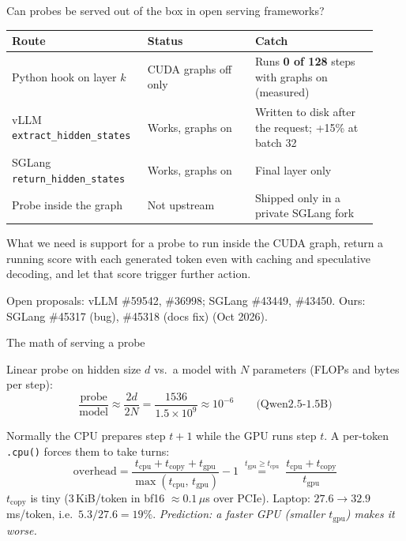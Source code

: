 \documentclass[final]{beamer}
\newlength{\COLGAP}\setlength{\COLGAP}{4.3cm}  %
\newlength{\colwidth}
\begin{document}
\begin{frame}[t]
\begin{columns}[t]
\begin{column}{\colwidth}
\begin{block}{Can probes be served out of the box in open serving frameworks?}
    \begin{table}
      \centering
      \begin{tabular}{@{}p{0.32\linewidth} p{0.28\linewidth} p{0.32\linewidth}@{}}
        \toprule
        \textbf{Route} & \textbf{Status} & \textbf{Catch} \\
        \midrule
        Python hook on layer $k$ & CUDA graphs off only & Runs \textbf{0 of 128} steps with graphs on (measured) \\
        vLLM \texttt{extract\_hidden\_states} & Works, graphs on & Written to disk after the request; +15\% at batch 32 \\
        SGLang \texttt{return\_hidden\_states} & Works, graphs on & Final layer only \\
        Probe inside the graph & Not upstream & Shipped only in a private SGLang fork \\
        \bottomrule
      \end{tabular}
    \end{table}

    What we need is support for a probe to run inside the CUDA graph, return a running score with each generated token even with caching and speculative decoding, and let that score trigger further action.

    {\footnotesize Open proposals: vLLM \#59542, \#36998; SGLang \#43449, \#43450.
    Ours: SGLang \#45317 (bug), \#45318 (docs fix) (Oct 2026).}

  \end{block}

  \vspace{\COLGAP}
  \begin{exampleblock}{The math of serving a probe}


    Linear probe on hidden size $d$ vs.\ a model with $N$ parameters (FLOPs and bytes per step):
    \[
      \frac{\text{probe}}{\text{model}} \approx \frac{2d}{2N}
      = \frac{1536}{1.5\times 10^{9}} \approx 10^{-6}
      \qquad \text{(Qwen2.5-1.5B)}
    \]


    Normally the CPU prepares step $t{+}1$ while the GPU runs step $t$. A
    per-token \texttt{.cpu()} forces them to take turns:
    \[
      \text{overhead}
      = \frac{t_{\text{cpu}} + t_{\text{copy}} + t_{\text{gpu}}}{\max(t_{\text{cpu}},\, t_{\text{gpu}})} - 1
      \;\overset{t_{\text{gpu}} \ge t_{\text{cpu}}}{=}\;
      \frac{t_{\text{cpu}} + t_{\text{copy}}}{t_{\text{gpu}}}
    \]
    $t_{\text{copy}}$ is tiny (3\,KiB/token in bf16 $\approx 0.1\,\mu$s over PCIe).
    Laptop: $27.6 \rightarrow 32.9$\,ms/token, i.e.\ $5.3/27.6 = 19\%$.
    \emph{Prediction: a faster GPU (smaller $t_{\text{gpu}}$) makes it worse.}


\end{exampleblock}
\end{column}
\end{columns}
\end{frame}
\end{document}
